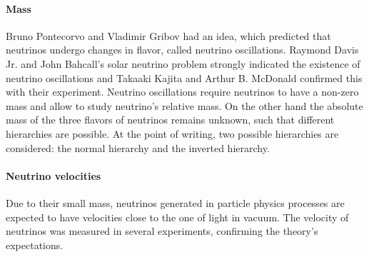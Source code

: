 \paragraph{Mass} Bruno Pontecorvo and Vladimir Gribov had an idea, which predicted that neutrinos undergo changes in flavor, called neutrino oscillations\cite{Bahcall:2004}.
Raymond Davis Jr. and John Bahcall's solar neutrino problem strongly indicated the existence of neutrino oscillations and Takaaki Kajita and Arthur B. McDonald confirmed this with their experiment.
Neutrino oscillations require neutrinos to have a non-zero mass and allow to study neutrino's relative mass.
On the other hand the absolute mass of the three flavors of neutrinos remains unknown, such that different hierarchies are possible.
At the point of writing, two possible hierarchies are considered: the normal hierarchy and the inverted hierarchy.

\paragraph{Neutrino velocities} Due to their small mass, neutrinos generated in particle physics processes are expected to have velocities close to the one of light in vacuum.
The velocity of neutrinos was measured in several experiments, confirming the theory's expectations\cite{Antonello:2012be}\cite{Adam:2011faa}.


